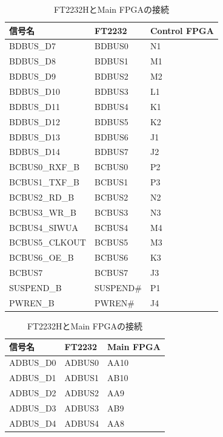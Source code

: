 \documentclass[dvipdfmx]{jlreq}
\begin{document}
\clearpage
\begin{table}[htbp]
  \centering
  \small
  \begin{minipage}[t]{0.48\textwidth}
    \centering
    \caption{FT2232HとControl FPGAの接続}
    \label{tab:ft2232_control}
    \begin{tabular}{|l|l|l|} \hline
      信号名 & FT2232 & Control FPGA \\ \hline \hline
      BDBUS\_D7 & BDBUS0 & N1 \\
      BDBUS\_D8 & BDBUS1 & M1 \\
      BDBUS\_D9 & BDBUS2 & M2 \\
      BDBUS\_D10 & BDBUS3 & L1 \\
      BDBUS\_D11 & BDBUS4 & K1 \\
      BDBUS\_D12 & BDBUS5 & K2 \\
      BDBUS\_D13 & BDBUS6 & J1 \\
      BDBUS\_D14 & BDBUS7 & J2 \\
      BCBUS0\_RXF\_B & BCBUS0 & P2 \\
      BCBUS1\_TXF\_B & BCBUS1 & P3 \\
      BCBUS2\_RD\_B & BCBUS2 & N2 \\
      BCBUS3\_WR\_B & BCBUS3 & N3 \\
      BCBUS4\_SIWUA & BCBUS4 & M4 \\
      BCBUS5\_CLKOUT & BCBUS5 & M3 \\
      BCBUS6\_OE\_B & BCBUS6 & K3 \\
      BCBUS7 & BCBUS7 & J3 \\
      SUSPEND\_B & SUSPEND\# & P1 \\
      PWREN\_B & PWREN\# & J4 \\ \hline
    \end{tabular}
  \end{minipage}\hfill
  \begin{minipage}[t]{0.48\textwidth}
    \centering
    \caption{FT2232HとMain FPGAの接続}
    \label{tab:ft2232_main}
    \begin{tabular}{|l|l|l|} \hline
      信号名 & FT2232 & Main FPGA \\ \hline \hline
      ADBUS\_D0 & ADBUS0 & AA10 \\
      ADBUS\_D1 & ADBUS1 & AB10 \\
      ADBUS\_D2 & ADBUS2 & AA9 \\
      ADBUS\_D3 & ADBUS3 & AB9 \\
      ADBUS\_D4 & ADBUS4 & AA8 \\

\end{tabular}
\end{minipage}
\end{table}
\end{document}
